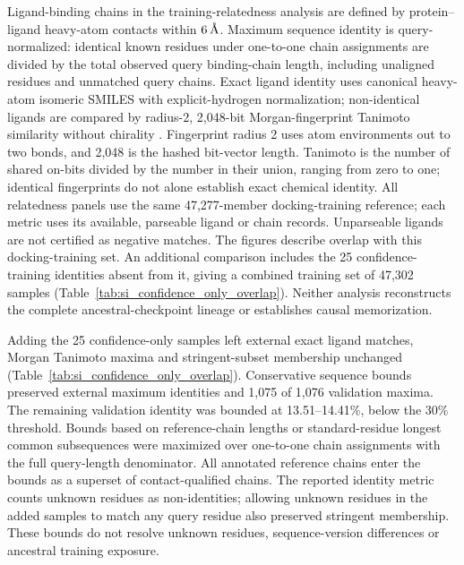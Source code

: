 \documentclass{article}
\newcommand{\angstrom}{\text{\normalfont\AA}}
\newcommand{\citep}[1]{\cite{#1}}
\begin{document}
Ligand-binding chains in the training-relatedness analysis are defined by protein--ligand heavy-atom contacts within $6\,\angstrom$.
Maximum sequence identity is query-normalized: identical known residues under one-to-one chain assignments are divided by the total observed query binding-chain length, including unaligned residues and unmatched query chains.
Exact ligand identity uses canonical heavy-atom isomeric SMILES with explicit-hydrogen normalization; non-identical ligands are compared by radius-2, 2,048-bit Morgan-fingerprint Tanimoto similarity without chirality \citep{rogers2010ecfp,landrum2024rdkit}.
Fingerprint radius 2 uses atom environments out to two bonds, and 2,048 is the hashed bit-vector length. Tanimoto is the number of shared on-bits divided by the number in their union, ranging from zero to one; identical fingerprints do not alone establish exact chemical identity.
All relatedness panels use the same 47,277-member docking-training reference; each metric uses its available, parseable ligand or chain records. Unparseable ligands are not certified as negative matches.
The figures describe overlap with this docking-training set. An additional comparison includes the 25 confidence-training identities absent from it, giving a combined training set of 47,302 samples (Table~\ref{tab:si_confidence_only_overlap}). Neither analysis reconstructs the complete ancestral-checkpoint lineage or establishes causal memorization.

Adding the 25 confidence-only samples left external exact ligand matches, Morgan Tanimoto maxima and stringent-subset membership unchanged (Table~\ref{tab:si_confidence_only_overlap}). Conservative sequence bounds preserved external maximum identities and 1,075 of 1,076 validation maxima. The remaining validation identity was bounded at 13.51--14.41\%, below the 30\% threshold. Bounds based on reference-chain lengths or standard-residue longest common subsequences were maximized over one-to-one chain assignments with the full query-length denominator. All annotated reference chains enter the bounds as a superset of contact-qualified chains. The reported identity metric counts unknown residues as non-identities; allowing unknown residues in the added samples to match any query residue also preserved stringent membership. These bounds do not resolve unknown residues, sequence-version differences or ancestral training exposure.
\end{document}
